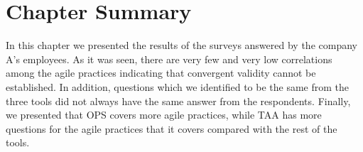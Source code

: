 

\section{Chapter Summary}
In this chapter we presented the results of the surveys answered by the company A's employees. As it was seen, there are very few and very low correlations among the agile practices indicating that convergent validity cannot be established. In addition, questions which we identified to be the same from the three tools did not always have the same answer from the respondents. Finally, we presented that \ac{OPS} covers more agile practices, while \ac{TAA} has more questions for the agile practices that it covers compared with the rest of the tools.
